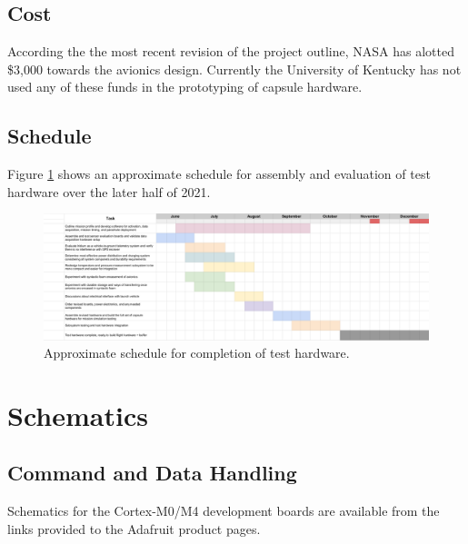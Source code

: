 \documentclass{article}
\begin{document}
\subsection{Cost}
According the the most recent revision of the project outline, NASA has alotted \$3,000 towards the avionics design. Currently the University of Kentucky has not used any of these funds in the prototyping of capsule hardware.


\subsection{Schedule}
Figure \ref{fig:schedule} shows an approximate schedule for assembly and evaluation of test hardware over the later half of 2021.
\begin{figure}[H]
	\centering
	\includegraphics[width=\textwidth]{images/schedule.png}
	\caption{Approximate schedule for completion of test hardware.}
	\label{fig:schedule}
\end{figure}





\appendix


\section{Schematics}
\label{appa}

\subsection{Command and Data Handling}
Schematics for the Cortex-M0/M4 development boards are available from the links provided to the Adafruit product pages.
\end{document}
